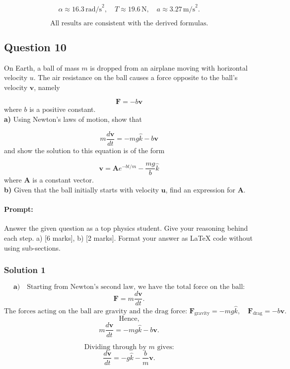 \documentclass{article}
\begin{document}
\[
\boxed{\alpha \approx 16.3\,\text{rad/s}^2, \quad T \approx 19.6\,\text{N}, \quad a \approx 3.27\,\text{m/s}^2.}
\]

\[
\text{All results are consistent with the derived formulas.}
\]

\subsection{Question 10}

On Earth, a ball of mass $m$ is dropped from an airplane moving with horizontal velocity $u$. The air resistance on the ball causes a force opposite to the ball's velocity $\mathbf{v}$, namely

\[
\mathbf{F} = -b \mathbf{v}
\]
where $b$ is a positive constant. \\

\textbf{a)} Using Newton's laws of motion, show that

\[
m \frac{d \mathbf{v}}{dt} = -mg \hat{k} - b \mathbf{v}
\]
and show the solution to this equation is of the form

\[
\mathbf{v} = \mathbf{A} e^{-bt/m} - \frac{mg}{b} \hat{k}
\]
where $\mathbf{A}$ is a constant vector.\\

\textbf{b)} Given that the ball initially starts with velocity $\mathbf{u}$, find an expression for $\mathbf{A}$.

\paragraph{Prompt: \\} 
Answer the given question as a top physics student. Give your reasoning behind each step. a) [6 marks], b) [2 marks].
Format your answer as LaTeX code without using sub-sections.

\subsubsection{Solution 1}
\[
\textbf{a)}\quad\text{Starting from Newton's second law, we have the total force on the ball:}
\]
\[
\mathbf{F} = m \frac{d\mathbf{v}}{dt}.
\]
\[
\text{The forces acting on the ball are gravity and the drag force: } \mathbf{F}_{\text{gravity}} = -mg \hat{k}, \quad \mathbf{F}_{\text{drag}} = -b \mathbf{v}.
\]
\[
\text{Hence,}
\]
\[
m \frac{d\mathbf{v}}{dt} = -mg \hat{k} - b \mathbf{v}.
\]

\[
\text{Dividing through by } m \text{ gives:}
\]
\[
\frac{d\mathbf{v}}{dt} = -g \hat{k} - \frac{b}{m} \mathbf{v}.
\]
\end{document}
